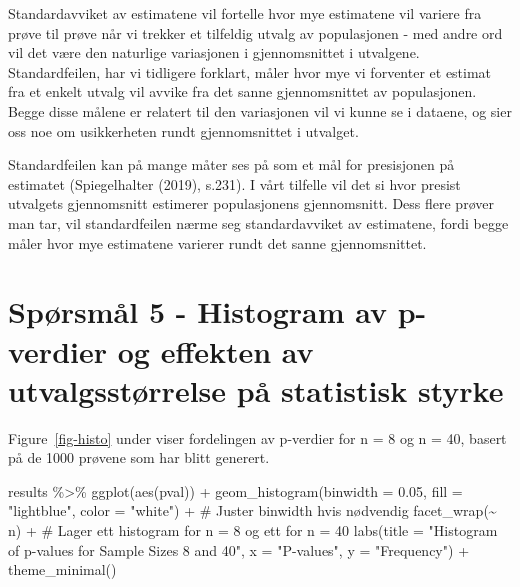\documentclass[
  letterpaper,
  DIV=11,
  numbers=noendperiod]{scrreprt}
\newenvironment{Shaded}{\begin{snugshade}}{\end{snugshade}}
\newcommand{\AttributeTok}[1]{\textcolor[rgb]{0.40,0.45,0.13}{#1}}
\newcommand{\CommentTok}[1]{\textcolor[rgb]{0.37,0.37,0.37}{#1}}
\newcommand{\FloatTok}[1]{\textcolor[rgb]{0.68,0.00,0.00}{#1}}
\newcommand{\FunctionTok}[1]{\textcolor[rgb]{0.28,0.35,0.67}{#1}}
\newcommand{\NormalTok}[1]{\textcolor[rgb]{0.00,0.23,0.31}{#1}}
\newcommand{\SpecialCharTok}[1]{\textcolor[rgb]{0.37,0.37,0.37}{#1}}
\newcommand{\StringTok}[1]{\textcolor[rgb]{0.13,0.47,0.30}{#1}}
\begin{document}
Standardavviket av estimatene vil fortelle hvor mye estimatene vil
variere fra prøve til prøve når vi trekker et tilfeldig utvalg av
populasjonen - med andre ord vil det være den naturlige variasjonen i
gjennomsnittet i utvalgene. Standardfeilen, har vi tidligere forklart,
måler hvor mye vi forventer et estimat fra et enkelt utvalg vil avvike
fra det sanne gjennomsnittet av populasjonen. Begge disse målene er
relatert til den variasjonen vil vi kunne se i dataene, og sier oss noe
om usikkerheten rundt gjennomsnittet i utvalget.

Standardfeilen kan på mange måter ses på som et mål for presisjonen på
estimatet (Spiegelhalter (2019), s.231). I vårt tilfelle vil det si hvor
presist utvalgets gjennomsnitt estimerer populasjonens gjennomsnitt.
Dess flere prøver man tar, vil standardfeilen nærme seg standardavviket
av estimatene, fordi begge måler hvor mye estimatene varierer rundt det
sanne gjennomsnittet.

\section{Spørsmål 5 - Histogram av p-verdier og effekten av
utvalgsstørrelse på statistisk
styrke}\label{spuxf8rsmuxe5l-5---histogram-av-p-verdier-og-effekten-av-utvalgsstuxf8rrelse-puxe5-statistisk-styrke}

Figure~\ref{fig-histo} under viser fordelingen av p-verdier for n = 8 og
n = 40, basert på de 1000 prøvene som har blitt generert.

\begin{Shaded}
\begin{Highlighting}[]
\NormalTok{results }\SpecialCharTok{\%\textgreater{}\%}
  \FunctionTok{ggplot}\NormalTok{(}\FunctionTok{aes}\NormalTok{(pval)) }\SpecialCharTok{+} 
  \FunctionTok{geom\_histogram}\NormalTok{(}\AttributeTok{binwidth =} \FloatTok{0.05}\NormalTok{, }\AttributeTok{fill =} \StringTok{"lightblue"}\NormalTok{, }\AttributeTok{color =} \StringTok{"white"}\NormalTok{) }\SpecialCharTok{+}  \CommentTok{\# Juster binwidth hvis nødvendig}
  \FunctionTok{facet\_wrap}\NormalTok{(}\SpecialCharTok{\textasciitilde{}}\NormalTok{ n) }\SpecialCharTok{+}  \CommentTok{\# Lager ett histogram for n = 8 og ett for n = 40}
  \FunctionTok{labs}\NormalTok{(}\AttributeTok{title =} \StringTok{"Histogram of p{-}values for Sample Sizes 8 and 40"}\NormalTok{,}
       \AttributeTok{x =} \StringTok{"P{-}values"}\NormalTok{,}
       \AttributeTok{y =} \StringTok{"Frequency"}\NormalTok{) }\SpecialCharTok{+}
  \FunctionTok{theme\_minimal}\NormalTok{()}
\end{Highlighting}
\end{Shaded}
\end{document}
